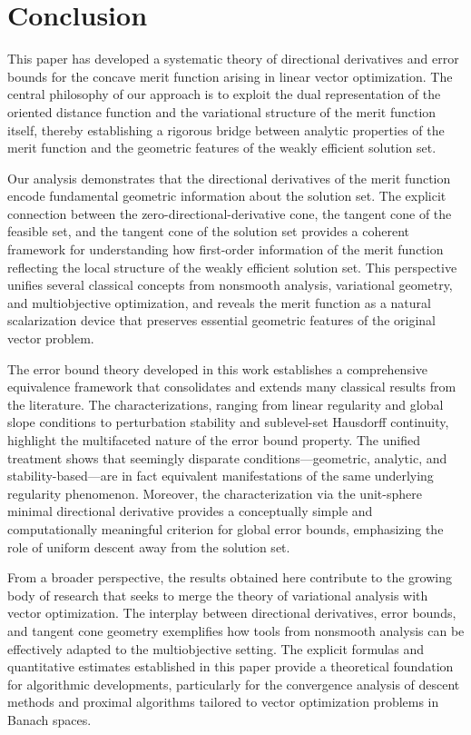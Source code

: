 \documentclass[11pt]{article}
\begin{document}
  
  

\section{Conclusion}

This paper has developed a systematic theory of directional derivatives and error bounds for the concave merit function arising in linear vector optimization. The central philosophy of our approach is to exploit the dual representation of the oriented distance function and the variational structure of the merit function itself, thereby establishing a rigorous bridge between analytic properties of the merit function and the geometric features of the weakly efficient solution set.

Our analysis demonstrates that the directional derivatives of the merit function encode fundamental geometric information about the solution set. The explicit connection between the zero-directional-derivative cone, the tangent cone of the feasible set, and the tangent cone of the solution set provides a coherent framework for understanding how first-order information of the merit function reflecting the local structure of the weakly efficient solution set. This perspective unifies several classical concepts from nonsmooth analysis, variational geometry, and multiobjective optimization, and reveals the merit function as a natural scalarization device that preserves essential geometric features of the original vector problem.

The error bound theory developed in this work establishes a comprehensive equivalence framework that consolidates and extends many classical results from the literature. The characterizations, ranging from linear regularity and global slope conditions to perturbation stability and sublevel-set Hausdorff continuity, highlight the multifaceted nature of the error bound property. The unified treatment shows that seemingly disparate conditions—geometric, analytic, and stability-based—are in fact equivalent manifestations of the same underlying regularity phenomenon. Moreover, the characterization via the unit-sphere minimal directional derivative provides a conceptually simple and computationally meaningful criterion for global error bounds, emphasizing the role of uniform descent away from the solution set.

From a broader perspective, the results obtained here contribute to the growing body of research that seeks to merge the theory of variational analysis with vector optimization. The interplay between directional derivatives, error bounds, and tangent cone geometry exemplifies how tools from nonsmooth analysis can be effectively adapted to the multiobjective setting. The explicit formulas and quantitative estimates established in this paper provide a theoretical foundation for algorithmic developments, particularly for the convergence analysis of descent methods and proximal algorithms tailored to vector optimization problems in Banach spaces.
\end{document}
